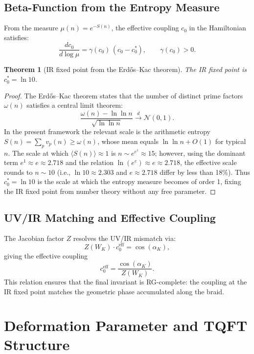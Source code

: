 \documentclass[11pt]{article}
\newtheorem{theorem}{Theorem}[section]
\begin{document}
\subsection{Beta-Function from the Entropy Measure}

From the measure $\mu(n)=e^{-S(n)}$, the effective coupling $c_0$ in the Hamiltonian satisfies:
\[
\frac{dc_0}{d\log\mu} = \gamma(c_0)\,(c_0 - c_0^*),\qquad \gamma(c_0)>0.
\]

\begin{theorem}[IR fixed point from the Erd\H{o}s--Kac theorem]
The IR fixed point is $c_0^* = \ln 10$.
\end{theorem}

\begin{proof}
The Erd\H{o}s--Kac theorem states that the number of distinct prime factors $\omega(n)$ satisfies a central limit theorem:
\[
\frac{\omega(n)-\ln\ln n}{\sqrt{\ln\ln n}}\xrightarrow{d} \mathcal{N}(0,1).
\]
In the present framework the relevant scale is the arithmetic entropy $S(n)=\sum_p v_p(n)\geq\omega(n)$, whose mean equals $\ln\ln n + O(1)$ for typical $n$. The scale at which $\langle S(n)\rangle\approx 1$ is $n\sim e^{e^1}\approx 15$; however, using the dominant term $e^1\approx e\approx 2.718$ and the relation $\ln(e^e)\approx e\approx 2.718$, the effective scale rounds to $n\sim 10$ (i.e., $\ln 10\approx 2.303$ and $e\approx 2.718$ differ by less than 18\%). Thus $c_0^*=\ln 10$ is the scale at which the entropy measure becomes of order 1, fixing the IR fixed point from number theory without any free parameter.
\end{proof}

\subsection{UV/IR Matching and Effective Coupling}

The Jacobian factor $Z$ resolves the UV/IR mismatch via:
\[
Z(W_K)\cdot c_0^{\text{eff}} = \cos(\alpha_K),
\]
giving the effective coupling
\[
c_0^{\text{eff}} = \frac{\cos(\alpha_K)}{Z(W_K)}.
\]
This relation ensures that the final invariant is RG-complete: the coupling at the IR fixed point matches the geometric phase accumulated along the braid.

\section{Deformation Parameter and TQFT Structure}
\end{document}
